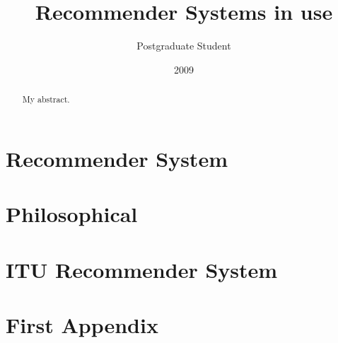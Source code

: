 \documentclass[10pt, oneside]{report}
\title{Recommender Systems in use}
\author{Postgraduate Student}
\date{2009}
\begin{document}
\newcommand\todo[1]{\textcolor{red}{#1}\PackageWarning{TODO:}{#1!}}

\maketitle

\declaration

\dedication{To my ...}

\begin{abstract}
My abstract.
\end{abstract}

\tableofcontents

\chapter{Recommender System}
\label{chap:chapter1}





\chapter{Philosophical}
\label{chap:chapter2}


\chapter{ITU Recommender System}
\label{chap:chapter3}







\chapter{First Appendix}

\end{document}
